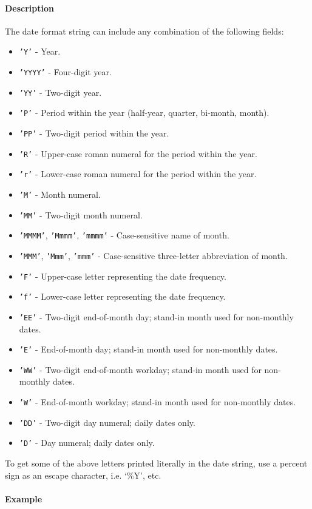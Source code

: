  \paragraph{Description}
 
 The date format string can include any combination of the following
 fields:
 
 \begin{itemize}
 \item
   \texttt{'Y'} - Year.
 \item
   \texttt{'YYYY'} - Four-digit year.
 \item
   \texttt{'YY'} - Two-digit year.
 \item
   \texttt{'P'} - Period within the year (half-year, quarter, bi-month,
   month).
 \item
   \texttt{'PP'} - Two-digit period within the year.
 \item
   \texttt{'R'} - Upper-case roman numeral for the period within the
   year.
 \item
   \texttt{'r'} - Lower-case roman numeral for the period within the
   year.
 \item
   \texttt{'M'} - Month numeral.
 \item
   \texttt{'MM'} - Two-digit month numeral.
 \item
   \texttt{'MMMM'}, \texttt{'Mmmm'}, \texttt{'mmmm'} - Case-sensitive
   name of month.
 \item
   \texttt{'MMM'}, \texttt{'Mmm'}, \texttt{'mmm'} - Case-sensitive
   three-letter abbreviation of month.
 \item
   \texttt{'F'} - Upper-case letter representing the date frequency.
 \item
   \texttt{'f'} - Lower-case letter representing the date frequency.
 \item
   \texttt{'EE'} - Two-digit end-of-month day; stand-in month used for
   non-monthly dates.
 \item
   \texttt{'E'} - End-of-month day; stand-in month used for non-monthly
   dates.
 \item
   \texttt{'WW'} - Two-digit end-of-month workday; stand-in month used
   for non-monthly dates.
 \item
   \texttt{'W'} - End-of-month workday; stand-in month used for
   non-monthly dates.
 \item
   \texttt{'DD'} - Two-digit day numeral; daily dates only.
 \item
   \texttt{'D'} - Day numeral; daily dates only.
 \end{itemize}
 
 To get some of the above letters printed literally in the date string,
 use a percent sign as an escape character, i.e. `\%Y', etc.
 
 \paragraph{Example}


